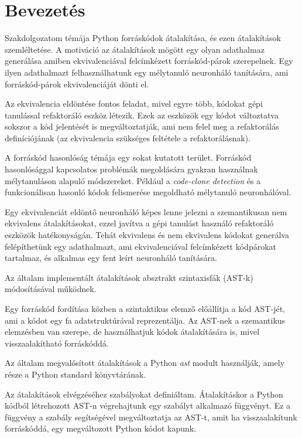 \chapter{Bevezetés}
\label{ch:intro}

Szakdolgozatom témája Python forráskódok átalakítása, és ezen átalakítások szemléltetése.
A motiváció az átalakítások mögött egy olyan adathalmaz generálása amiben
ekvivalenciával felcímkézett forráskód-párok szerepelnek.
Egy ilyen adathalmazt felhasználhatunk egy mélytanuló
neuronháló tanítására, ami forráskód-párok ekvivalenciáját dönti el.

Az ekvivalencia eldöntése fontos feladat, mivel egyre több, kódokat gépi tanulással refaktoráló eszköz létezik.
Ezek az eszközök egy kódot változtatva sokszor a kód jelentését is megváltoztatják, ami nem felel meg
a refaktorálás definíciójának (az ekvivalencia szükséges feltétele a refaktorálásnak).

A forráskód hasonlóság témája egy sokat kutatott terület.
Forráskód hasonlósággal kapcsolatos problémák megoldására gyakran használnak mélytanuláson alapuló módszereket.
Például a \emph{code-clone detection} \cite{CCLearner} és a funkcionálisan hasonló kódok felismerése \cite{DeepSim, ContrastiveCodeRepr}
megoldható mélytanuló neuronhálóval.

Egy ekvivalenciát eldöntő neuronháló képes lenne jelezni a szemantikusan nem ekvivalens átalakításokat,
ezzel javítva a gépi tanulást használó refaktoráló eszközök hatékonyságán.
Tehát ekvivalens és nem ekvivalens kódokat generálva felépíthetünk egy adathalmazt, ami
ekvivalenciával felcímkézett kódpárokat tartalmaz, és alkalmas egy fent leírt neuronháló
tanítására.

Az általam implementált átalakítások absztrakt szintaxisfák (AST-k) módosításával működnek.

Egy forráskód fordítása közben a szintaktikus elemző előállítja a kód AST-jét,
ami a kódot egy fa adatstruktúrával reprezentálja.
Az AST-nek a szemantikus elemzésben van szerepe,
de használhatjuk kódok átalakítására is, mivel visszaalakítható forráskóddá.

Az általam megvalósított átalakítások a Python \emph{ast} modult \cite{pythonAST} használják,
amely része a Python standard könyvtárának.

Az átalakítások elvégzéséhez szabályokat definiáltam.
Átalakításkor a Python kódból létrehozott AST-n végrehajtunk egy szabályt alkalmazó függvényt.
Ez a függvény a szabály segítségével megváltoztatja az AST-t, amit ha visszaalakítunk forráskóddá,
egy megváltozott Python kódot kapunk.


